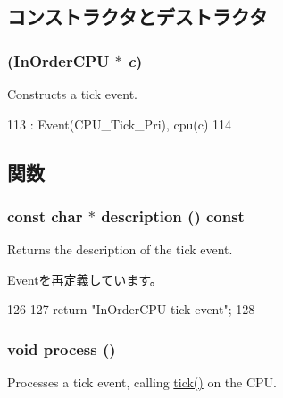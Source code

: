 \subsection{コンストラクタとデストラクタ}
\hypertarget{classInOrderCPU_1_1TickEvent_a91e781d00e5f088fc04009180b13cadb}{
\subsubsection[{TickEvent}]{ ({\bf InOrderCPU} $\ast$ {\em c})}}
\label{classInOrderCPU_1_1TickEvent_a91e781d00e5f088fc04009180b13cadb}
Constructs a tick event. 


\begin{DoxyCode}
113   : Event(CPU_Tick_Pri), cpu(c)
114 { }
\end{DoxyCode}


\subsection{関数}
\hypertarget{classInOrderCPU_1_1TickEvent_a5a14fe478e2393ff51f02e9b7be27e00}{
\subsubsection[{description}]{\setlength{\rightskip}{0pt plus 5cm}const char $\ast$ description () const}}
\label{classInOrderCPU_1_1TickEvent_a5a14fe478e2393ff51f02e9b7be27e00}
Returns the description of the tick event. 

\hyperlink{classEvent_a130ddddf003422b413e2e891b1b80e8f}{Event}を再定義しています。


\begin{DoxyCode}
126 {
127     return "InOrderCPU tick event";
128 }
\end{DoxyCode}
\hypertarget{classInOrderCPU_1_1TickEvent_a2e9c5136d19b1a95fc427e0852deab5c}{
\subsubsection[{process}]{\setlength{\rightskip}{0pt plus 5cm}void process ()}}
\label{classInOrderCPU_1_1TickEvent_a2e9c5136d19b1a95fc427e0852deab5c}
Processes a tick event, calling \hyperlink{classInOrderCPU_a873dd91783f9efb4a590aded1f70d6b0}{tick()} on the CPU. 

